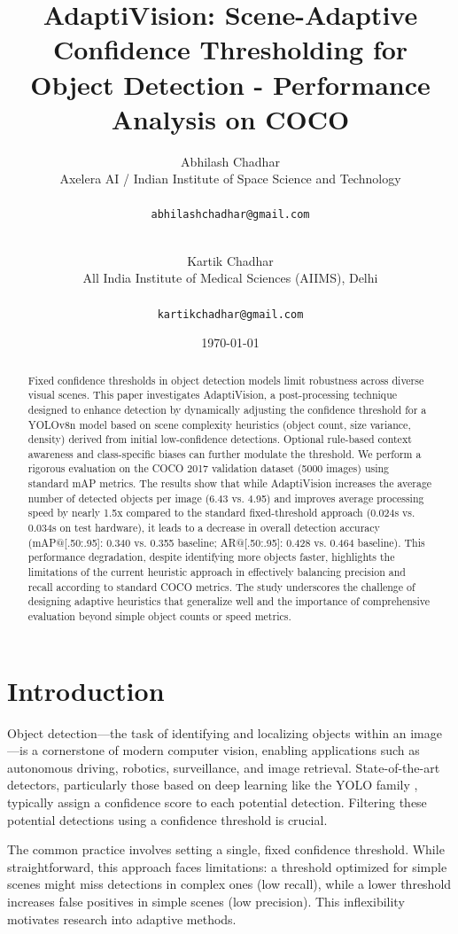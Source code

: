 \documentclass{article}
\title{AdaptiVision: Scene-Adaptive Confidence Thresholding for Object Detection - Performance Analysis on COCO}
\author{
  Abhilash Chadhar \\
  Axelera AI / Indian Institute of Space Science and Technology \\
  \\
  \texttt{abhilashchadhar@gmail.com} \\
  \and \\
  Kartik Chadhar \\
  All India Institute of Medical Sciences (AIIMS), Delhi \\
  \\
  \texttt{kartikchadhar@gmail.com}
}
\date{\today} %
\begin{document}
\maketitle

\begin{abstract}
Fixed confidence thresholds in object detection models limit robustness across diverse visual scenes. This paper investigates AdaptiVision, a post-processing technique designed to enhance detection by dynamically adjusting the confidence threshold for a YOLOv8n model based on scene complexity heuristics (object count, size variance, density) derived from initial low-confidence detections. Optional rule-based context awareness and class-specific biases can further modulate the threshold. We perform a rigorous evaluation on the COCO 2017 validation dataset (5000 images) using standard mAP metrics. The results show that while AdaptiVision increases the average number of detected objects per image (6.43 vs. 4.95) and improves average processing speed by nearly 1.5x compared to the standard fixed-threshold approach (0.024s vs. 0.034s on test hardware), it leads to a decrease in overall detection accuracy (mAP@[.50:.95]: 0.340 vs. 0.355 baseline; AR@[.50:.95]: 0.428 vs. 0.464 baseline). This performance degradation, despite identifying more objects faster, highlights the limitations of the current heuristic approach in effectively balancing precision and recall according to standard COCO metrics. The study underscores the challenge of designing adaptive heuristics that generalize well and the importance of comprehensive evaluation beyond simple object counts or speed metrics.
\end{abstract}

\section{Introduction}

Object detection—the task of identifying and localizing objects within an image—is a cornerstone of modern computer vision, enabling applications such as autonomous driving, robotics, surveillance, and image retrieval. State-of-the-art detectors, particularly those based on deep learning like the YOLO family \cite{YOLOv3, YOLOv4, YOLOv6, YOLOv7}, typically assign a confidence score to each potential detection. Filtering these potential detections using a confidence threshold is crucial.

The common practice involves setting a single, fixed confidence threshold. While straightforward, this approach faces limitations: a threshold optimized for simple scenes might miss detections in complex ones (low recall), while a lower threshold increases false positives in simple scenes (low precision). This inflexibility motivates research into adaptive methods.
\end{document}
